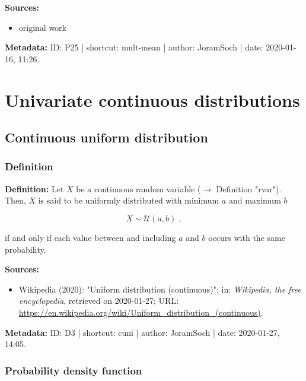 \documentclass[a4paper,12pt]{book}
\begin{document}
\vspace{1em}
\textbf{Sources:}
\begin{itemize}
\item original work\end{itemize}


\vspace{1em}
\textbf{Metadata:} ID: P25 | shortcut: mult-mean | author: JoramSoch | date: 2020-01-16, 11:26.


\pagebreak
\section{Univariate continuous distributions}

\subsection{Continuous uniform distribution}

\subsubsection[\textit{Definition}]{Definition} \label{sec:cuni}

\vspace{1em}
\textbf{Definition:} Let $X$ be a continuous random variable ($\rightarrow$ Definition "rvar"). Then, $X$ is said to be uniformly distributed with minimum $a$ and maximum $b$

\begin{equation} \label{eq:cuni-cuni}
X \sim \mathcal{U}(a, b) \; ,
\end{equation}

if and only if each value between and including $a$ and $b$ occurs with the same probability.

\vspace{1em}
\textbf{Sources:}
\begin{itemize}
\item Wikipedia (2020): "Uniform distribution (continuous)"; in: \textit{Wikipedia, the free encyclopedia}, retrieved on 2020-01-27; URL: \url{https://en.wikipedia.org/wiki/Uniform_distribution_(continuous)}.
\end{itemize}


\vspace{1em}
\textbf{Metadata:} ID: D3 | shortcut: cuni | author: JoramSoch | date: 2020-01-27, 14:05.


\subsubsection[\textbf{Probability density function}]{Probability density function} \label{sec:cuni-pdf}
\end{document}
